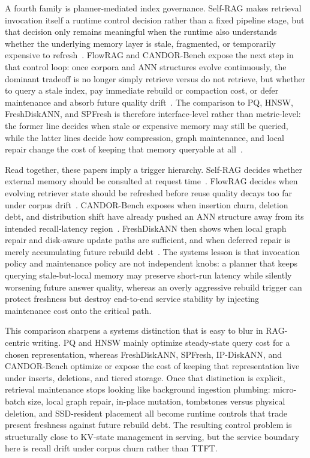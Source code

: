 \documentclass[acmsmall,screen,review]{acmart}
\begin{document}
A fourth family is planner-mediated index governance. Self-RAG makes retrieval invocation itself a runtime control decision rather than a fixed pipeline stage, but that decision only remains meaningful when the runtime also understands whether the underlying memory layer is stale, fragmented, or temporarily expensive to refresh~\cite{asai2024selfrag}. FlowRAG and CANDOR-Bench expose the next step in that control loop: once corpora and ANN structures evolve continuously, the dominant tradeoff is no longer simply retrieve versus do not retrieve, but whether to query a stale index, pay immediate rebuild or compaction cost, or defer maintenance and absorb future quality drift~\cite{zhang2026flowrag,wang2026candor}. The comparison to PQ, HNSW, FreshDiskANN, and SPFresh is therefore interface-level rather than metric-level: the former line decides when stale or expensive memory may still be queried, while the latter lines decide how compression, graph maintenance, and local repair change the cost of keeping that memory queryable at all~\cite{jegou2011pq,malkov2020hnsw,singh2021freshdiskann,xu2023spfresh}.

Read together, these papers imply a trigger hierarchy. Self-RAG decides whether external memory should be consulted at request time~\cite{asai2024selfrag}. FlowRAG decides when evolving retriever state should be refreshed before reuse quality decays too far under corpus drift~\cite{zhang2026flowrag}. CANDOR-Bench exposes when insertion churn, deletion debt, and distribution shift have already pushed an ANN structure away from its intended recall-latency region~\cite{wang2026candor}. FreshDiskANN then shows when local graph repair and disk-aware update paths are sufficient, and when deferred repair is merely accumulating future rebuild debt~\cite{singh2021freshdiskann}. The systems lesson is that invocation policy and maintenance policy are not independent knobs: a planner that keeps querying stale-but-local memory may preserve short-run latency while silently worsening future answer quality, whereas an overly aggressive rebuild trigger can protect freshness but destroy end-to-end service stability by injecting maintenance cost onto the critical path.

This comparison sharpens a systems distinction that is easy to blur in RAG-centric writing. PQ and HNSW mainly optimize steady-state query cost for a chosen representation, whereas FreshDiskANN, SPFresh, IP-DiskANN, and CANDOR-Bench optimize or expose the cost of keeping that representation live under inserts, deletions, and tiered storage. Once that distinction is explicit, retrieval maintenance stops looking like background ingestion plumbing: micro-batch size, local graph repair, in-place mutation, tombstones versus physical deletion, and SSD-resident placement all become runtime controls that trade present freshness against future rebuild debt. The resulting control problem is structurally close to KV-state management in serving, but the service boundary here is recall drift under corpus churn rather than TTFT.
\end{document}
